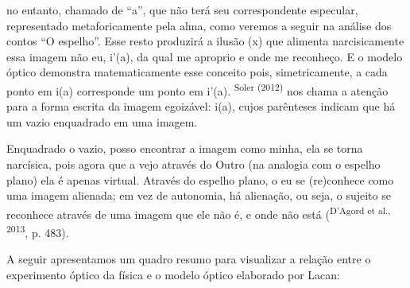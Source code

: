 \begin{multicols}{2}
no entanto,\allowbreak{} chamado de “a”,\allowbreak{} que não terá seu correspondente especular,\allowbreak{} representado metaforicamente pela alma,\allowbreak{} como veremos a seguir na análise dos contos “O espelho”.\allowbreak{} Esse resto produzirá a ilusão (\allowbreak{}x)\allowbreak{} que alimenta narcisicamente essa imagem não eu,\allowbreak{} i’(\allowbreak{}a)\allowbreak{},\allowbreak{} da qual me aproprio e onde me reconheço.\allowbreak{} E o modelo óptico demonstra matematicamente esse conceito pois,\allowbreak{} simetricamente,\allowbreak{} a cada ponto em i(\allowbreak{}a)\allowbreak{} corresponde um ponto em i’(\allowbreak{}a)\allowbreak{}.\allowbreak{} \textsuperscript{Soler (\allowbreak{}2012)\allowbreak{}} nos chama a atenção para a forma escrita da imagem egoizável:\allowbreak{} i(\allowbreak{}a)\allowbreak{},\allowbreak{} cujos parênteses indicam que há um vazio enquadrado em uma imagem.\allowbreak{}\par{}Enquadrado o vazio,\allowbreak{} posso encontrar a imagem como minha,\allowbreak{} ela se torna narcísica,\allowbreak{} pois agora que a vejo através do Outro (\allowbreak{}na analogia com o espelho plano)\allowbreak{} ela é apenas virtual.\allowbreak{} Através do espelho plano,\allowbreak{} o eu se (\allowbreak{}re)\allowbreak{}conhece como uma imagem alienada; em vez de autonomia,\allowbreak{} há alienação,\allowbreak{} ou seja,\allowbreak{} o sujeito se reconhece através de uma imagem que ele não é,\allowbreak{} e onde não está (\allowbreak{}\textsuperscript{D’Agord et al.\allowbreak{},\allowbreak{} 2013},\allowbreak{} p.\allowbreak{} 483)\allowbreak{}.\allowbreak{}\par{}A seguir apresentamos um quadro resumo para visualizar a relação entre o experimento óptico da física e o modelo óptico elaborado por Lacan:\allowbreak{}\par{}\end{multicols}
{}
